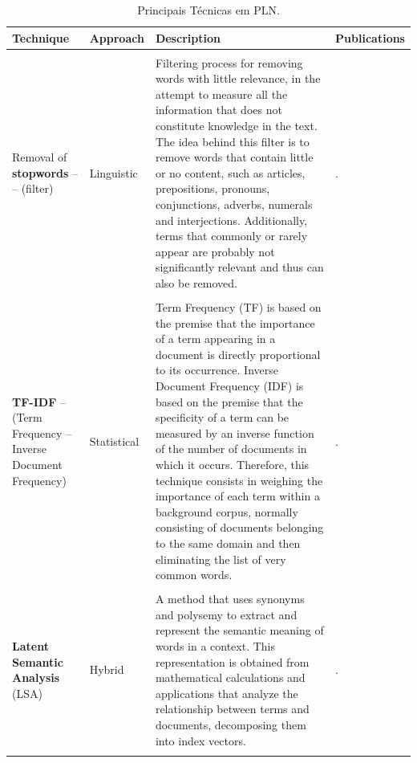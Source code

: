 \documentclass[english]{textolivre}
\begin{document}
\setlength\LTleft{-1in}
\setlength\LTright{-1in}
\begin{longtable}{p{3cm}p{2cm}p{7cm}p{3.5cm}}
\caption{Principais Técnicas em PLN.}\label{tbl01}
\\
\toprule
\textbf{Technique} & \textbf{Approach} & \textbf{Description} & \textbf{Publications}\\
\hline \\
\endfirsthead
{\footnotesize Removal of \textbf{stopwords} – – (filter)} & {\footnotesize Linguistic} & {\footnotesize Filtering process for removing words with little relevance, in the attempt to measure all the information that does not constitute knowledge in the text. The idea behind this filter is to remove words that contain little or no content, such as articles, prepositions, pronouns, conjunctions, adverbs, numerals and interjections. Additionally, terms that commonly or rarely appear are probably not significantly relevant and thus can also be removed.} & {\footnotesize \textcite{luhn_automatic_1958, salton_introduction_1983, frakes_information_1992,lui_evaluation_2007, de_oliveira_junior_monitoramento_2012}}. \\
\\
{\footnotesize \textbf{TF-IDF} – (Term Frequency – Inverse Document Frequency)} & {\footnotesize Statistical} & {\footnotesize Term Frequency (TF) is based on the premise that the importance of a term appearing in a document is directly proportional to its occurrence. Inverse Document Frequency (IDF) is based on the premise that the specificity of a term can be measured by an inverse function of the number of documents in which it occurs. Therefore, this technique consists in weighing the importance of each term within a background corpus, normally consisting of documents belonging to the same domain and then eliminating the list of very common words.} & {\footnotesize \textcite{luhn_automatic_1958,jones_thesauric_1972,bhatia_literature_2015,liu_analyze_2017,rocha_pragmasum:_2017}}. \\\\

{\footnotesize \textbf{Latent Semantic Analysis} (LSA)} & {\footnotesize Hybrid} & {\footnotesize A method that uses synonyms and polysemy to extract and represent the semantic meaning of words in a context. This representation is obtained from mathematical calculations and applications that analyze the relationship between terms and documents, decomposing them into index vectors.} 
& {\footnotesize \textcite{landauer_introduction_1998,scarton_alise_2010}.}\\
 \\
 

\end{longtable}
\end{document}
